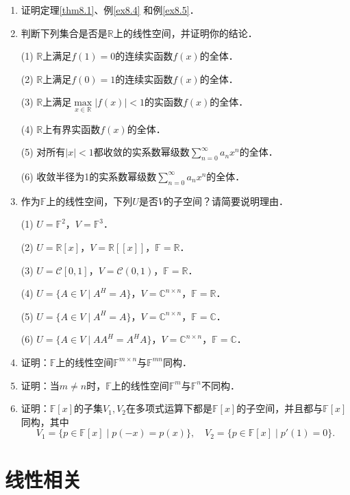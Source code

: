 \documentclass[a4paper,fontset=windows]{ctexbook}
\theoremstyle{definition}
\begin{document}
\begin{enumerate}
\item 证明定理\ref{thm8.1}、例\ref{ex8.4} 和例\ref{ex8.5}．

\item 判断下列集合是否是$\mathbb{R}$上的线性空间，并证明你的结论．

(1) $\mathbb{R}$上满足$f(1) =0$的连续实函数$f(x)$的全体．

(2) $\mathbb{R}$上满足$f(0)=1$的连续实函数$f(x)$的全体．

(3) $\mathbb{R}$上满足$\max\limits_{x\in\mathbb{R}}|f(x)|<1$的实函数$f(x)$的全体．

(4) $\mathbb{R}$上有界实函数$f(x)$的全体．

(5) 对所有$|x|<1$都收敛的实系数幂级数$\sum\limits_{n=0}^{\infty}a_nx^n$的全体．

(6) 收敛半径为1的实系数幂级数$\sum\limits_{n=0}^{\infty}a_nx^n$的全体．

\item 作为$\mathbb{F}$上的线性空间，下列$U$是否$V$的子空间？请简要说明理由．

(1) $U=\mathbb{F}^2$，$V=\mathbb{F}^3$．

(2) $U=\mathbb{R}[x]$，$V=\mathbb{R}[[x]]$，$\mathbb{F}=\mathbb{R}$．

(3) $U=\mathscr{C}[0,1]$，$V=\mathscr{C}(0,1)$，$\mathbb{F}=\mathbb{R}$．

(4) $U=\{A\in V\mid A^H=A\}$，$V=\mathbb{C}^{n\times n}$，$\mathbb{F}=\mathbb{R}$．

(5) $U=\{A\in V\mid A^H=A\}$，$V=\mathbb{C}^{n\times n}$，$\mathbb{F}=\mathbb{C}$．

(6) $U=\{A\in V\mid AA^H=A^HA\}$，$V=\mathbb{C}^{n\times n}$，$\mathbb{F}=\mathbb{C}$．

\item 证明：$\mathbb{F}$上的线性空间$\mathbb{F}^{m\times n}$与$\mathbb{F}^{mn}$同构．

\item 证明：当$m\ne n$时，$\mathbb{F}$上的线性空间$\mathbb{F}^m$与$\mathbb{F}^n$不同构．

\item 证明：$\mathbb{F}[x]$的子集$V_1,V_2$在多项式运算下都是$\mathbb{F}[x]$的子空间，并且都与$\mathbb{F}[x]$同构，其中
$$V_1=\{p\in\mathbb{F}[x]\mid p(-x)=p(x)\},\quad V_2=\{p\in\mathbb{F}[x]\mid p'(1)=0\}.$$

\end{enumerate}

\clearpage\section{线性相关}
\end{document}
